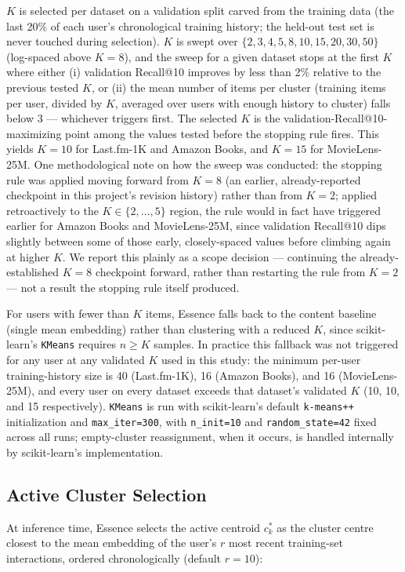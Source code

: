 \documentclass[11pt,a4paper]{article}
\begin{document}
$K$ is selected per dataset on a validation split carved from the
training data (the last 20\% of each user's chronological training
history; the held-out test set is never touched during selection). $K$
is swept over $\{2, 3, 4, 5, 8, 10, 15, 20, 30, 50\}$ (log-spaced above
$K=8$), and the sweep for a given dataset stops at the first $K$ where
either (i) validation Recall@10 improves by less than 2\% relative to
the previous tested $K$, or (ii) the mean number of items per cluster
(training items per user, divided by $K$, averaged over users with
enough history to cluster) falls below 3 --- whichever triggers first.
The selected $K$ is the validation-Recall@10-maximizing point among the
values tested before the stopping rule fires. This yields $K=10$ for
Last.fm-1K and Amazon Books, and $K=15$ for MovieLens-25M. One
methodological note on how the sweep was conducted: the stopping rule
was applied moving forward from $K=8$ (an earlier, already-reported
checkpoint in this project's revision history) rather than from $K=2$;
applied retroactively to the $K\in\{2,\ldots,5\}$ region, the rule would
in fact have triggered earlier for Amazon Books and MovieLens-25M, since
validation Recall@10 dips slightly between some of those early,
closely-spaced values before climbing again at higher $K$. We report
this plainly as a scope decision --- continuing the already-established
$K=8$ checkpoint forward, rather than restarting the rule from $K=2$ ---
not a result the stopping rule itself produced.

For users with fewer than $K$ items, Essence falls back to the content
baseline (single mean embedding) rather than clustering with a reduced
$K$, since scikit-learn's \texttt{KMeans} requires $n \geq K$ samples. In
practice this fallback was not triggered for any user at any validated
$K$ used in this study: the minimum per-user training-history size is 40
(Last.fm-1K), 16 (Amazon Books), and 16 (MovieLens-25M), and every user
on every dataset exceeds that dataset's validated $K$ (10, 10, and 15
respectively). \texttt{KMeans} is run with scikit-learn's default
\texttt{k-means++} initialization and \texttt{max\_iter=300}, with
\texttt{n\_init=10} and \texttt{random\_state=42} fixed across all runs;
empty-cluster reassignment, when it occurs, is handled internally by
scikit-learn's implementation.

\subsection{Active Cluster Selection}
\label{subsec:active}
At inference time, Essence selects the active centroid $c_k^*$ as the
cluster centre closest to the mean embedding of the user's $r$ most recent
training-set interactions, ordered chronologically (default $r=10$):
\end{document}
